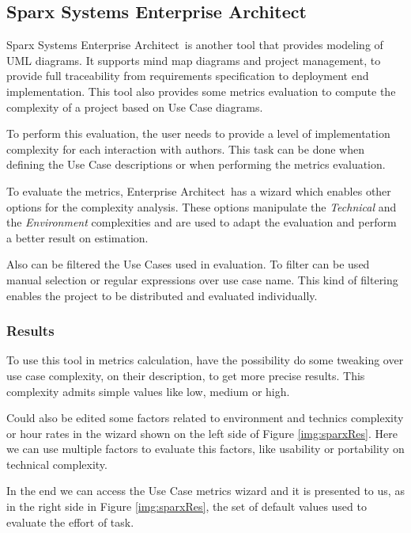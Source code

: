 \subsection{Sparx Systems Enterprise Architect}
\def \entArch {\textsf{Enterprise Architect}}
Sparx Systems \entArch\ is another tool that provides modeling of UML diagrams.
It supports mind map diagrams and project management, to provide full traceability from requirements specification to deployment end implementation.
This tool also provides some metrics evaluation to compute the complexity of a project based on Use Case diagrams. 

To perform this evaluation, the user needs to provide a level of implementation complexity for each interaction with authors. 
This task can be done when defining the Use Case descriptions or when performing the metrics evaluation.

To evaluate the metrics, \entArch\ has a wizard which enables other options for the complexity analysis.
These options manipulate the \emph{Technical} and the \emph{Environment} complexities and are used to adapt the evaluation and perform a better result on estimation.

Also can be filtered the Use Cases used in evaluation. 
To filter can be used manual selection or regular expressions over use case name.
This kind of filtering enables the project to be distributed and evaluated individually.
\subsubsection{Results}

To use this tool in metrics calculation, have the possibility do some tweaking over use case complexity, on their description, to get more precise results. This complexity admits simple values like low, medium or high.

Could also be edited some factors related to environment and technics complexity or hour rates in the wizard shown on the left side of Figure \ref{img:sparxRes}. Here we can use multiple factors to evaluate this factors, like usability or portability on technical complexity.

In the end we can access the Use Case metrics wizard and it is presented to us, as in the right side in Figure \ref{img:sparxRes}, the set of default values used to evaluate the effort of task.

